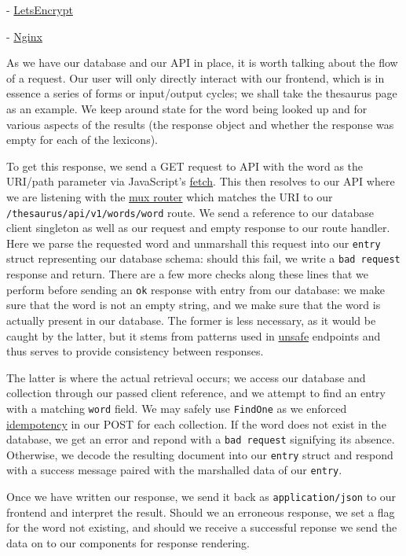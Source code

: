 \documentclass[11pt, twoside, reqno]{book}
\begin{document}
- \href{https://letsencrypt.org/}{LetsEncrypt}

- \href{https://www.nginx.com}{Nginx}

As we have our database and our API in place, it is worth talking about the flow of a request. Our user will only directly interact with our frontend, which is in essence a series of forms or input/output cycles; we shall take the thesaurus page as an example. We keep around state for the word being looked up and for various aspects of the results (the response object and whether the response was empty for each of the lexicons).

To get this response, we send a GET request to API with the word as the URI/path parameter via JavaScript's \href{https://developer.mozilla.org/en-US/docs/Web/API/Fetch_API}{fetch}. This then resolves to our API where we are listening with the \href{http://www.gorillatoolkit.org/pkg/mux}{mux router} which matches the URI to our \texttt{/thesaurus/api/v1/words/{word}} route. We send a reference to our database client singleton as well as our request and empty response to our route handler. Here we parse the requested word and unmarshall this request into our \texttt{entry} struct representing our database schema: should this fail, we write a \texttt{bad request} response and return. There are a few more checks along these lines that we perform before sending an \texttt{ok} response with entry from our database: we make sure that the word is not an empty string, and we make sure that the word is actually present in our database. The former is less necessary, as it would be caught by the latter, but it stems from patterns used in \href{https://developer.mozilla.org/en-US/docs/Glossary/safe}{unsafe} endpoints and thus serves to provide consistency between responses.

The latter is where the actual retrieval occurs; we access our database and collection through our passed client reference, and we attempt to find an entry with a matching \texttt{word} field. We may safely use \texttt{FindOne} as we enforced \href{https://developer.mozilla.org/en-US/docs/Glossary/idempotent}{idempotency} in our POST for each collection. If the word does not exist in the database, we get an error and repond with a \texttt{bad request} signifying its absence. Otherwise, we decode the resulting document into our \texttt{entry} struct and respond with a success message paired with the marshalled data of our \texttt{entry}.

Once we have written our response, we send it back as \texttt{application/json} to our frontend and interpret the result. Should we an erroneous response, we set a flag for the word not existing, and should we receive a successful reponse we send the data on to our components for response rendering.
\end{document}
